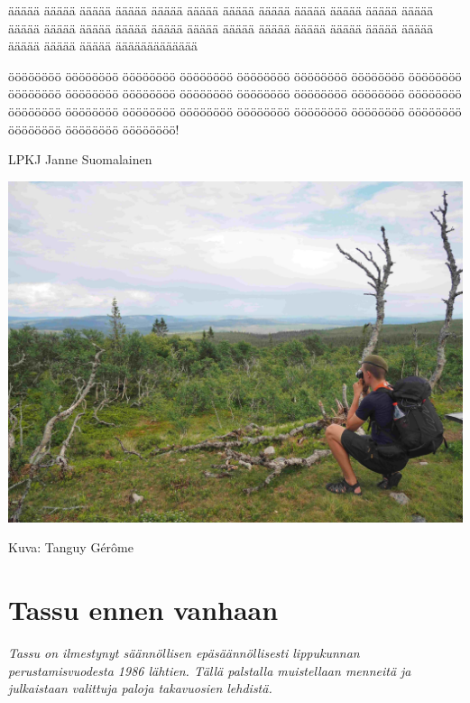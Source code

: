 \documentclass[10pt,finnish,a5paper,twoside=semi]{scrartcl}
\begin{document}

\begin{multicols}{2}


\noindent äääää äääää äääää äääää äääää äääää äääää äääää äääää äääää äääää äääää äääää äääää äääää äääää äääää äääää äääää äääää äääää äääää äääää äääää äääää äääää äääää äääääääääääää

öööööööö öööööööö öööööööö öööööööö öööööööö öööööööö öööööööö öööööööö öööööööö öööööööö öööööööö öööööööö öööööööö öööööööö öööööööö öööööööö öööööööö öööööööö öööööööö öööööööö öööööööö öööööööö öööööööö öööööööö öööööööö öööööööö öööööööö! \\

\vspace*{0.50cm}

\null\hfill LPKJ Janne Suomalainen

\end{multicols}


\medskip
\noindent\includegraphics[width=\linewidth]{assets/lpkjtervehdys}

\medskip
\noindent\null\hfill Kuva: Tanguy Gérôme

\clearpage\section{Tassu ennen vanhaan}
\textit{Tassu on ilmestynyt säännöllisen epäsäännöllisesti lippukunnan perustamisvuodesta 1986
lähtien. Tällä palstalla muistellaan menneitä ja julkaistaan valittuja paloja takavuosien
lehdistä.}
\end{document}
